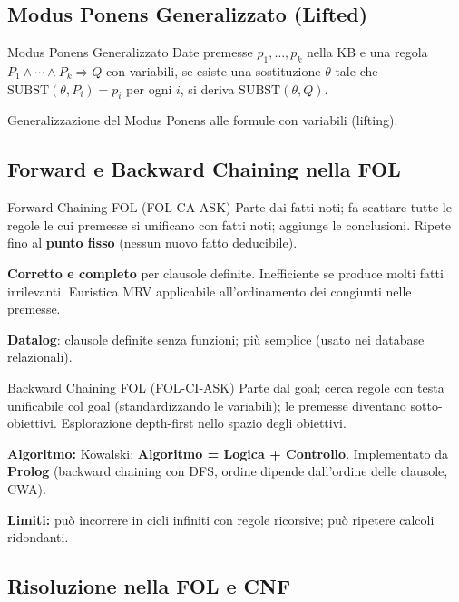 \documentclass[12pt,a4paper]{article}
\begin{document}
\subsection{Modus Ponens Generalizzato (Lifted)}

\begin{formulabox}{Modus Ponens Generalizzato}
Date premesse $p_1, \ldots, p_k$ nella KB e una regola $P_1 \land \cdots \land P_k \Rightarrow Q$ con variabili, se esiste una sostituzione $\theta$ tale che $\text{SUBST}(\theta, P_i) = p_i$ per ogni $i$, si deriva $\text{SUBST}(\theta, Q)$.

Generalizzazione del Modus Ponens alle formule con variabili (lifting).
\end{formulabox}

\subsection{Forward e Backward Chaining nella FOL}

\begin{thmbox}{Forward Chaining FOL (FOL-CA-ASK)}
Parte dai fatti noti; fa scattare tutte le regole le cui premesse si unificano con fatti noti; aggiunge le conclusioni. Ripete fino al \textbf{punto fisso} (nessun nuovo fatto deducibile).

\textbf{Corretto e completo} per clausole definite. Inefficiente se produce molti fatti irrilevanti. Euristica MRV applicabile all'ordinamento dei congiunti nelle premesse.

\textbf{Datalog}: clausole definite senza funzioni; più semplice (usato nei database relazionali).
\end{thmbox}

\begin{thmbox}{Backward Chaining FOL (FOL-CI-ASK)}
Parte dal goal; cerca regole con testa unificabile col goal (standardizzando le variabili); le premesse diventano sotto-obiettivi. Esplorazione depth-first nello spazio degli obiettivi.

\textbf{Algoritmo:} Kowalski: \textbf{Algoritmo = Logica + Controllo}. Implementato da \textbf{Prolog} (backward chaining con DFS, ordine dipende dall'ordine delle clausole, CWA).

\textbf{Limiti:} può incorrere in cicli infiniti con regole ricorsive; può ripetere calcoli ridondanti.
\end{thmbox}

\subsection{Risoluzione nella FOL e CNF}
\end{document}
